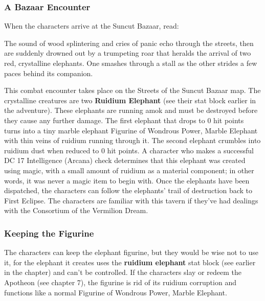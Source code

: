 \documentclass[10pt,a4,twoside,twocolumn,openany,nodeprecatedcode]{dndbook}
\begin{document}
\subsubsection{A Bazaar Encounter}
When the characters arrive at the Suncut Bazaar, read:
\begin{DndReadAloud}{}
The sound of wood splintering and cries of panic echo through the streets, then are suddenly drowned out by a trumpeting roar that heralds the arrival of two red, crystalline elephants. One smashes through a stall as the other strides a few paces behind its companion.
\end{DndReadAloud}

This combat encounter takes place on the Streets of the Suncut Bazaar map. The crystalline creatures are two \textbf{Ruidium Elephant} (see their stat block earlier in the adventure). These elephants are running amok and must be destroyed before they cause any further damage.
The first elephant that drops to 0 hit points turns into a tiny marble elephant Figurine of Wondrous Power, Marble Elephant with thin veins of ruidium running through it.
The second elephant crumbles into ruidium dust when reduced to 0 hit points. A character who makes a successful DC 17 Intelligence (Arcana) check determines that this elephant was created using magic, with a small amount of ruidium as a material component; in other words, it was never a magic item to begin with.
Once the elephants have been dispatched, the characters can follow the elephants' trail of destruction back to First Eclipse. The characters are familiar with this tavern if they've had dealings with the Consortium of the Vermilion Dream.
\subsubsection{Keeping the Figurine}
The characters can keep the elephant figurine, but they would be wise not to use it, for the elephant it creates uses the \textbf{ruidium elephant} stat block (see earlier in the chapter) and can't be controlled.
If the characters slay or redeem the Apotheon (see chapter 7), the figurine is rid of its ruidium corruption and functions like a normal Figurine of Wondrous Power, Marble Elephant.
\end{document}
